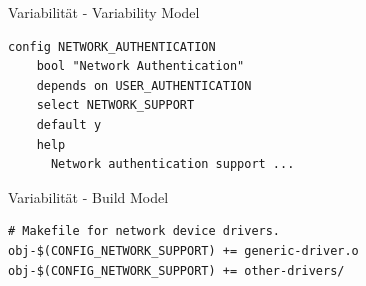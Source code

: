 \documentclass[compress, aspectratio=43, noserifmath]{beamer}
\begin{document}
{ %
    \begin{frame}[plain]
     \end{frame}
}

\begin{frame}[containsverbatim]{Variabilit\"at - Variability Model}
\begin{verbatim}
config NETWORK_AUTHENTICATION
	bool "Network Authentication"
	depends on USER_AUTHENTICATION
	select NETWORK_SUPPORT
	default y
	help
	  Network authentication support ...

\end{verbatim}
\end{frame}


\begin{frame}[containsverbatim]{Variabilit\"at - Build Model}
\begin{verbatim}
# Makefile for network device drivers.
obj-$(CONFIG_NETWORK_SUPPORT) += generic-driver.o
obj-$(CONFIG_NETWORK_SUPPORT) += other-drivers/

\end{verbatim}
\end{frame}
\end{document}
